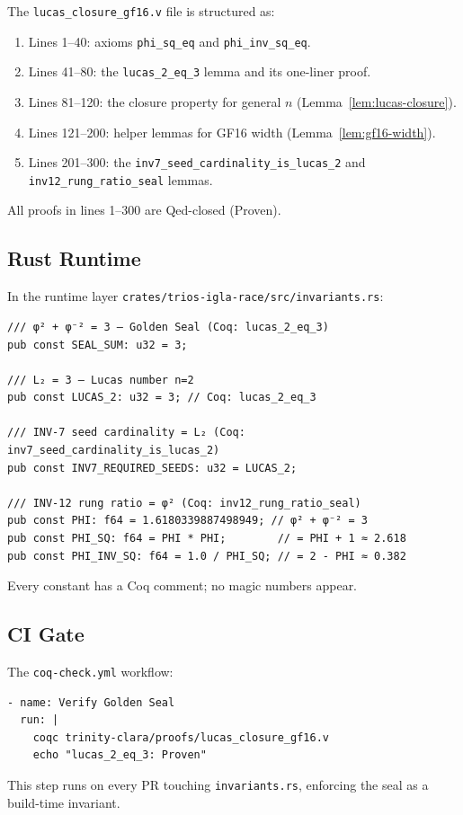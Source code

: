 The \texttt{lucas\_closure\_gf16.v} file is structured as:

\begin{enumerate}
  \item Lines 1--40: axioms \texttt{phi\_sq\_eq} and
        \texttt{phi\_inv\_sq\_eq}.
  \item Lines 41--80: the \texttt{lucas\_2\_eq\_3} lemma
        and its one-liner proof.
  \item Lines 81--120: the closure property for general $n$
        (Lemma~\ref{lem:lucas-closure}).
  \item Lines 121--200: helper lemmas for GF16 width
        (Lemma~\ref{lem:gf16-width}).
  \item Lines 201--300: the \texttt{inv7\_seed\_cardinality\_is\_lucas\_2}
        and \texttt{inv12\_rung\_ratio\_seal} lemmas.
\end{enumerate}

All proofs in lines 1--300 are Qed-closed (Proven).

\subsection{Rust Runtime}

In the runtime layer
\texttt{crates/trios-igla-race/src/invariants.rs}:

\begin{verbatim}
/// φ² + φ⁻² = 3 — Golden Seal (Coq: lucas_2_eq_3)
pub const SEAL_SUM: u32 = 3;

/// L₂ = 3 — Lucas number n=2
pub const LUCAS_2: u32 = 3; // Coq: lucas_2_eq_3

/// INV-7 seed cardinality = L₂ (Coq: inv7_seed_cardinality_is_lucas_2)
pub const INV7_REQUIRED_SEEDS: u32 = LUCAS_2;

/// INV-12 rung ratio = φ² (Coq: inv12_rung_ratio_seal)
pub const PHI: f64 = 1.6180339887498949; // φ² + φ⁻² = 3
pub const PHI_SQ: f64 = PHI * PHI;        // = PHI + 1 ≈ 2.618
pub const PHI_INV_SQ: f64 = 1.0 / PHI_SQ; // = 2 - PHI ≈ 0.382
\end{verbatim}

Every constant has a Coq comment; no magic numbers appear.

\subsection{CI Gate}

The \texttt{coq-check.yml} workflow:
\begin{verbatim}
- name: Verify Golden Seal
  run: |
    coqc trinity-clara/proofs/lucas_closure_gf16.v
    echo "lucas_2_eq_3: Proven"
\end{verbatim}
This step runs on every PR touching \texttt{invariants.rs},
enforcing the seal as a build-time invariant.

